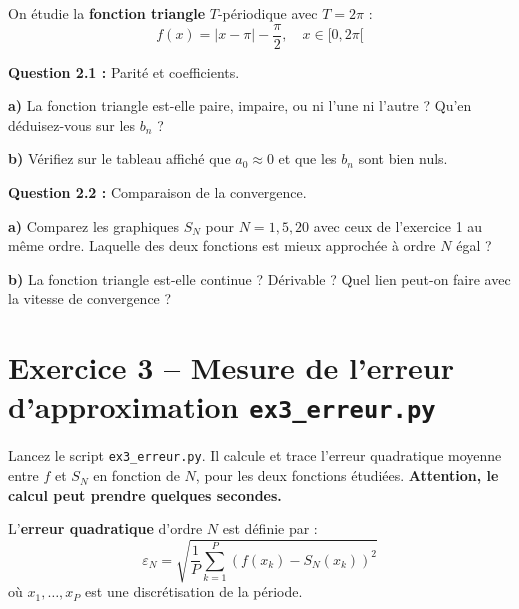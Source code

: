 \documentclass[12pt,a4paper]{article}
\newcommand{\cadreReponse}[1][4]{%
    \begin{mdframed}[
        backgroundcolor=repbg,
        linecolor=repframe,
        linewidth=1pt,
        roundcorner=4pt,
        innertopmargin=6pt,
        innerbottommargin=6pt,
    ]
    \vspace{#1\baselineskip}
    \end{mdframed}%
}
\begin{document}
\vfill 

On étudie la \textbf{fonction triangle} $T$-périodique avec $T = 2\pi$ :
\[
    f(x) = \left| x - \pi \right| - \frac{\pi}{2}, \quad x \in [0, 2\pi[
\]

\vfill 

\newpage 


\begin{exercicebox}
\textbf{Question 2.1 :} Parité et coefficients.
\end{exercicebox}

\medskip
\noindent\textbf{a)} La fonction triangle est-elle paire, impaire, ou ni l'une ni l'autre ? Qu'en déduisez-vous sur les $b_n$ ?

\cadreReponse[2]

\noindent\textbf{b)} Vérifiez sur le tableau affiché que $a_0 \approx 0$ et que les $b_n$ sont bien nuls.

\cadreReponse[2]

\begin{exercicebox}
\textbf{Question 2.2 :} Comparaison de la convergence.
\end{exercicebox}

\medskip
\noindent\textbf{a)} Comparez les graphiques $S_N$ pour $N = 1, 5, 20$ avec ceux de l'exercice 1 au même ordre. Laquelle des deux fonctions est mieux approchée à ordre $N$ égal ?

\cadreReponse[3]

\noindent\textbf{b)} La fonction triangle est-elle continue ? Dérivable ? Quel lien peut-on faire avec la vitesse de convergence ?

\cadreReponse[3]

\section{Exercice 3 -- Mesure de l'erreur d'approximation \hfill\normalsize\texttt{ex3\_erreur.py}}

\begin{fichierbox}
Lancez le script \texttt{ex3\_erreur.py}. Il calcule et trace l'erreur quadratique moyenne entre $f$ et $S_N$ en fonction de $N$, pour les deux fonctions étudiées. \textbf{Attention, le calcul peut prendre quelques secondes.}
\end{fichierbox}

\medskip
L'\textbf{erreur quadratique} d'ordre $N$ est définie par :
\[
    \varepsilon_N = \sqrt{\frac{1}{P} \sum_{k=1}^{P} \left( f(x_k) - S_N(x_k) \right)^2}
\]
où $x_1, \ldots, x_P$ est une discrétisation de la période.
\end{document}
